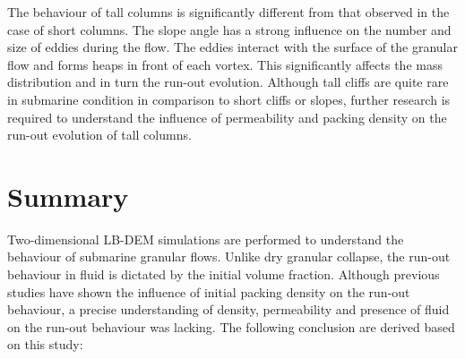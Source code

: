 The behaviour of tall columns is significantly different from that observed in 
the case of short columns. The slope angle has a strong influence on the number 
and size of eddies during the flow. The eddies interact with the surface of the 
granular flow and forms heaps in front of each vortex. This significantly 
affects the mass distribution and in turn the run-out evolution. Although tall 
cliffs are quite rare in submarine condition in comparison to short cliffs or 
slopes, further research is required to understand the influence of 
permeability and packing density on the run-out evolution of tall columns. 


\section{Summary}

Two-dimensional LB-DEM simulations are performed to understand the behaviour 
of submarine granular flows. Unlike dry granular collapse, the run-out 
behaviour in fluid is dictated by the initial volume fraction. Although 
previous studies have shown the influence of initial packing density on the 
run-out behaviour, a precise understanding of density, permeability and 
presence of fluid on the run-out behaviour was lacking. The following 
conclusion are derived based on this study:

